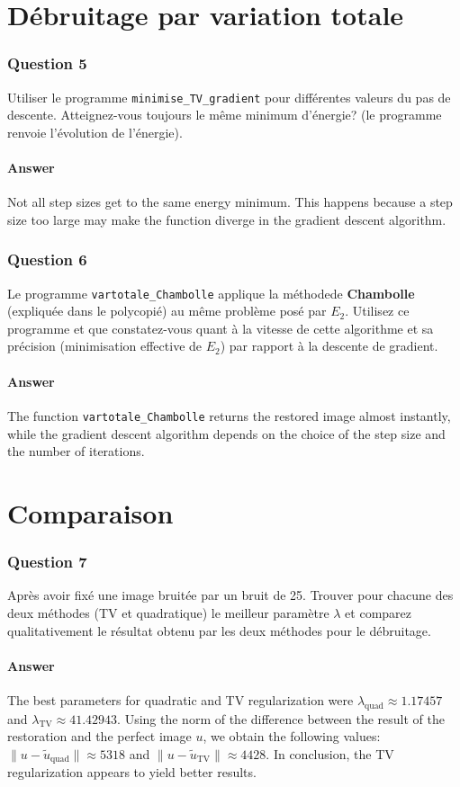 \documentclass{article}
\begin{document}
    \section{Débruitage par variation totale}

    \subsubsection*{Question 5}
    Utiliser le programme \texttt{minimise\_TV\_gradient} pour différentes valeurs du pas de descente. Atteignez-vous toujours le même minimum d’énergie? (le programme renvoie l’évolution de l’énergie).

    \paragraph{Answer}
    Not all step sizes get to the same energy minimum. This happens because a step size too large may make the function diverge in the gradient descent algorithm.


    \subsubsection*{Question 6}
    Le programme \texttt{vartotale\_Chambolle} applique la méthodede \textbf{Chambolle} (expliquée dans le polycopié) au même problème posé par $E_2$. Utilisez ce programme et que constatez-vous quant à la vitesse de cette algorithme et sa précision (minimisation effective de $E_2$) par rapport à la descente de gradient.

    \paragraph{Answer}
    The function \texttt{vartotale\_Chambolle} returns the restored image almost instantly, while the gradient descent algorithm depends on the choice of the step size and the number of iterations.


    \section{Comparaison}

    \subsubsection*{Question 7}
    Après avoir fixé une image bruitée par un bruit de 25. Trouver pour chacune des deux méthodes (TV et quadratique) le meilleur paramètre $\lambda$ et comparez qualitativement le résultat obtenu par les deux méthodes pour le débruitage.

    \paragraph{Answer}
    The best parameters for quadratic and TV regularization were $\lambda_\text{quad} \approx 1.17457$ and $\lambda_\text{TV} \approx 41.42943$.
    Using the norm of the difference between the result of the restoration and the perfect image $u$, we obtain the following values: $\| u - \tilde{u}_\text{quad} \| \approx 5318$ and $\| u - \tilde{u}_\text{TV} \| \approx 4428$.
    In conclusion, the TV regularization appears to yield better results.
\end{document}
